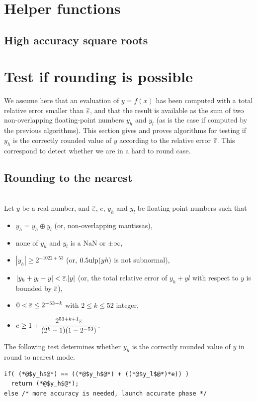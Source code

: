 \section{Helper functions \label{section:helperfunctions}}

\subsection{High accuracy square roots \label{subsection:sqrt}}




\section{Test if rounding is possible
\label{section:testrounding}}

We assume here that an evaluation of $y=f(x)$ has been computed with a
total relative error smaller than ${\overline{\varepsilon}}$, and that the result is
available as the sum of two non-overlapping floating-point numbers
$y_h$ and $y_l$ (as is the case if computed by the previous
algorithms). This section gives and proves algorithms for testing if
$y_h$ is the correctly rounded value of $y$ according to the relative
error ${\overline{\varepsilon}}$. This correspond to detect whether we are in a hard
to round case.




\subsection{Rounding to the nearest}

\begin{theorem}
\label{th:roundingRN1}
~\\
Let $y$ be a real number, and  ${\overline{\varepsilon}}$, $e$, $y_h$ and $y_l$ be
  floating-point numbers such that 
  \begin{itemize}
  \item $y_h=y_h\oplus y_l$ (or, non-overlapping mantissas),
  \item none of $y_h$ and $y_l$ is a  NaN or $\pm \infty$,
  \item $|y_h|\ge 2^{-1022+53}$ (or, $0.5\mbox{ulp}(yh)$ is not subnormal), 
  \item $|y_h+y_l - y| <{\overline{\varepsilon}}.|y|$ (or, the total relative error of $y_h+yl$ with respect to $y$ is bounded by ${\overline{\varepsilon}}$),
  \item $0<{\overline{\varepsilon}} \le 2^{-53-k}$ with $2\le k \le 52$ integer,
  \item $e\ge 1+  \dfrac{2^{53+k+1}{\overline{\varepsilon}}}{(2^{k}-1)(1-2^{-53})}$.
\end{itemize}

The following test determines whether $y_h$ is the
  correctly rounded value of $y$ in  round to nearest mode.

\begin{lstlisting}[caption={Test for rounding to the nearest},
  firstnumber=1]
if( (*@$y_h$@*) == ((*@$y_h$@*) + ((*@$y_l$@*)*e)) )
  return (*@$y_h$@*);
else /* more accuracy is needed, launch accurate phase */
\end{lstlisting}
\end{theorem}


